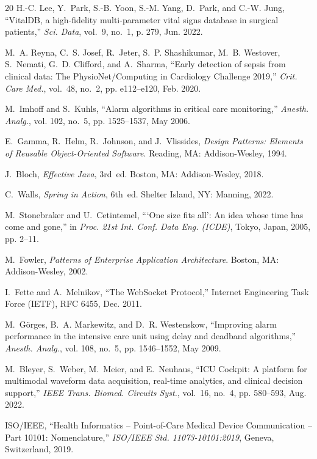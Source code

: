 \documentclass[10pt,journal,compsoc]{IEEEtran}
\begin{document}
\begin{thebibliography}{20}
H.-C. Lee, Y.~Park, S.-B. Yoon, S.-M. Yang, D.~Park, and C.-W. Jung, ``{VitalDB}, a high-fidelity multi-parameter vital signs database in surgical patients,'' \emph{Sci. Data}, vol.~9, no.~1, p. 279, Jun. 2022.

M.~A. Reyna, C.~S. Josef, R.~Jeter, S.~P. Shashikumar, M.~B. Westover, S.~Nemati, G.~D. Clifford, and A.~Sharma, ``Early detection of sepsis from clinical data: The {PhysioNet/Computing in Cardiology Challenge 2019},'' \emph{Crit. Care Med.}, vol.~48, no.~2, pp. e112--e120, Feb. 2020.

M.~Imhoff and S.~Kuhls, ``Alarm algorithms in critical care monitoring,'' \emph{Anesth. Analg.}, vol. 102, no.~5, pp. 1525--1537, May 2006.

E.~Gamma, R.~Helm, R.~Johnson, and J.~Vlissides, \emph{Design Patterns: Elements of Reusable Object-Oriented Software}. Reading, MA: Addison-Wesley, 1994.

J.~Bloch, \emph{Effective Java}, 3rd~ed. Boston, MA: Addison-Wesley, 2018.

C.~Walls, \emph{Spring in Action}, 6th~ed. Shelter Island, NY: Manning, 2022.

M.~Stonebraker and U.~Cetintemel, ```One size fits all': An idea whose time has come and gone,'' in \emph{Proc. 21st Int. Conf. Data Eng. (ICDE)}, Tokyo, Japan, 2005, pp. 2--11.

M.~Fowler, \emph{Patterns of Enterprise Application Architecture}. Boston, MA: Addison-Wesley, 2002.

I.~Fette and A.~Melnikov, ``The {WebSocket} Protocol,'' Internet Engineering Task Force (IETF), RFC 6455, Dec. 2011.

M.~G{\"o}rges, B.~A. Markewitz, and D.~R. Westenskow, ``Improving alarm performance in the intensive care unit using delay and deadband algorithms,'' \emph{Anesth. Analg.}, vol. 108, no.~5, pp. 1546--1552, May 2009.

M.~Bleyer, S.~Weber, M.~Meier, and E.~Neuhaus, ``{ICU Cockpit}: A platform for multimodal waveform data acquisition, real-time analytics, and clinical decision support,'' \emph{IEEE Trans. Biomed. Circuits Syst.}, vol.~16, no.~4, pp. 580--593, Aug. 2022.

ISO/IEEE, ``Health Informatics -- Point-of-Care Medical Device Communication -- Part 10101: Nomenclature,'' \emph{ISO/IEEE Std. 11073-10101:2019}, Geneva, Switzerland, 2019.

\end{thebibliography}
\end{document}
